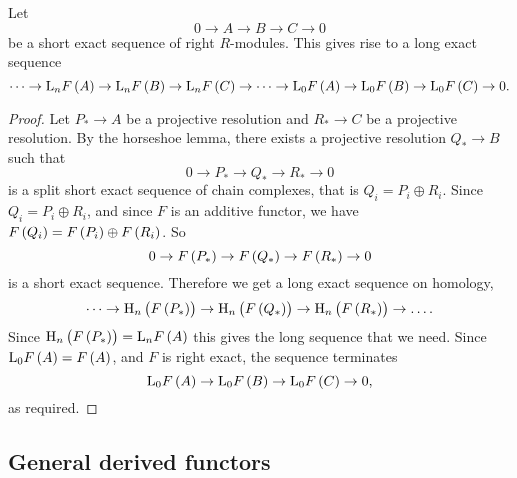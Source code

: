 
\begin{proposition}
Let
$$ 0 \to A \to B \to C \to 0 $$
be a short exact sequence of right $ R $-modules. This gives rise to a long exact sequence
$$ \dots \to \L_nF\br{A} \to \L_nF\br{B} \to \L_nF\br{C} \to \dots \to \L_0F\br{A} \to \L_0F\br{B} \to \L_0F\br{C} \to 0. $$
\end{proposition}

\pagebreak

\begin{proof}
Let $ P_* \to A $ be a projective resolution and $ R_* \to C $ be a projective resolution. By the horseshoe lemma, there exists a projective resolution $ Q_* \to B $ such that
$$ 0 \to P_* \to Q_* \to R_* \to 0 $$
is a split short exact sequence of chain complexes, that is $ Q_i = P_i \oplus R_i $. Since $ Q_i = P_i \oplus R_i $, and since $ F $ is an additive functor, we have $ F\br{Q_i} = F\br{P_i} \oplus F\br{R_i} $. So
$$ 0 \to F\br{P_*} \to F\br{Q_*} \to F\br{R_*} \to 0 $$
is a short exact sequence. Therefore we get a long exact sequence on homology,
$$ \dots \to \H_n\br{F\br{P_*}} \to \H_n\br{F\br{Q_*}} \to \H_n\br{F\br{R_*}} \to \dots. $$
Since $ \H_n\br{F\br{P_*}} = \L_nF\br{A} $ this gives the long sequence that we need. Since $ \L_0F\br{A} = F\br{A} $, and $ F $ is right exact, the sequence terminates
$$ \L_0F\br{A} \to \L_0F\br{B} \to \L_0F\br{C} \to 0, $$
as required.
\end{proof}

\subsection{General derived functors}

